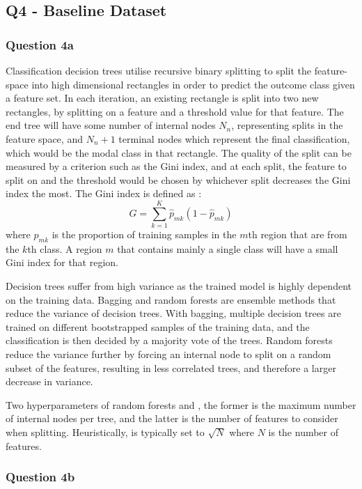 
\subsection{Q4 - Baseline Dataset}\label{subsec:q4}
\subsubsection{Question 4a}\label{subsubsec:q4a}
    Classification decision trees utilise recursive binary splitting to split the feature-space into high dimensional
    rectangles in order to predict the outcome class given a feature set.
    In each iteration, an existing rectangle is split into two new rectangles, by splitting on a feature and a threshold
    value for that feature.
    The end tree will have some number of internal nodes $N_{n}$, representing splits in the feature space, and $N_{n} + 1$
    terminal nodes which represent the final classification, which would be the modal class in that rectangle.
    The quality of the split can be measured by a criterion such as the Gini index, and at each split, the feature to
    split on and the threshold would be chosen by whichever split decreases the Gini index the most.
    The Gini index is defined as \cite{ISL}:
    \begin{equation}
        G = \sum_{k=1}^{K} \hat{p}_{mk}(1 - \hat{p}_{mk})
        \label{eq:gini-index}
    \end{equation}
    where $\hat{p}_{mk}$ is the proportion of training samples in the $m$th region that are from the $k$th class.
    A region $m$ that contains mainly a single class will have a small Gini index for that region.

    Decision trees suffer from high variance as the trained model is highly dependent on the training data.
    Bagging and random forests are ensemble methods that reduce the variance of decision trees.
    With bagging, multiple decision trees are trained on different bootstrapped samples of the training data, and the
    classification is then decided by a majority vote of the trees.
    Random forests reduce the variance further by forcing an internal node to split on a random subset of the features,
    resulting in less correlated trees, and therefore a larger decrease in variance.

    Two hyperparameters of random forests  and , the former is the
    maximum number of internal nodes per tree, and the latter is the number of features to consider when splitting.
    Heuristically,  is typically set to $\sqrt{N}$ where $N$ is the number of features.

\subsubsection{Question 4b}\label{subsubsec:q4b}
